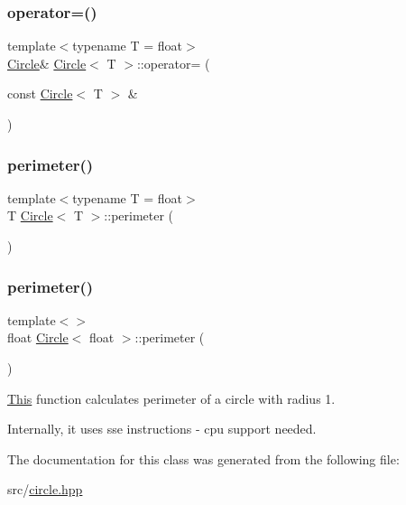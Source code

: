 \subsubsection{\texorpdfstring{operator=()}{operator=()}\hspace{0.1cm}{\footnotesize\ttfamily [2/2]}}
{\footnotesize\ttfamily template$<$typename T  = float$>$ \\
\mbox{\hyperlink{classCircle}{Circle}}\& \mbox{\hyperlink{classCircle}{Circle}}$<$ T $>$\+::operator= (\begin{DoxyParamCaption}\item[{const \mbox{\hyperlink{classCircle}{Circle}}$<$ T $>$ \&}]{ }\end{DoxyParamCaption})\hspace{0.3cm}{\ttfamily [default]}}

\mbox{\label{classCircle_a6f066fc39c0de339b0498b04a56be028}} 
\subsubsection{\texorpdfstring{perimeter()}{perimeter()}\hspace{0.1cm}{\footnotesize\ttfamily [1/2]}}
{\footnotesize\ttfamily template$<$typename T  = float$>$ \\
T \mbox{\hyperlink{classCircle}{Circle}}$<$ T $>$\+::perimeter (\begin{DoxyParamCaption}{ }\end{DoxyParamCaption})}

\mbox{\label{classCircle_aa6c86a4a5d3ee7eb598879ba856430d9}} 
\subsubsection{\texorpdfstring{perimeter()}{perimeter()}\hspace{0.1cm}{\footnotesize\ttfamily [2/2]}}
{\footnotesize\ttfamily template$<$$>$ \\
float \mbox{\hyperlink{classCircle}{Circle}}$<$ float $>$\+::perimeter (\begin{DoxyParamCaption}{ }\end{DoxyParamCaption})\hspace{0.3cm}{\ttfamily [inline]}}



\mbox{\hyperlink{classThis}{This}} function calculates perimeter of a circle with radius 1. 

Internally, it uses sse instructions -\/ cpu support needed. 

The documentation for this class was generated from the following file\+:\begin{DoxyCompactItemize}
\item 
src/\mbox{\hyperlink{circle_8hpp}{circle.\+hpp}}\end{DoxyCompactItemize}
